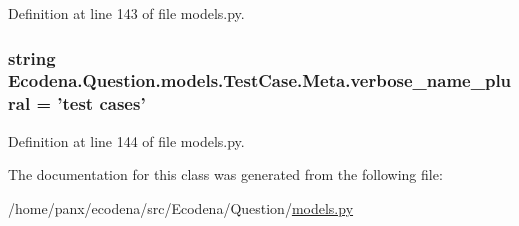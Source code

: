 Definition at line 143 of file models.py.

\hypertarget{class_ecodena_1_1_question_1_1models_1_1_test_case_1_1_meta_a5d437326b1d427e4225daeb42b308535}{
\subsubsection[{verbose\_\-name\_\-plural}]{\setlength{\rightskip}{0pt plus 5cm}string {\bf Ecodena.Question.models.TestCase.Meta.verbose\_\-name\_\-plural} = 'test cases'}}
\label{d7/de8/class_ecodena_1_1_question_1_1models_1_1_test_case_1_1_meta_a5d437326b1d427e4225daeb42b308535}


Definition at line 144 of file models.py.



The documentation for this class was generated from the following file:\begin{DoxyCompactItemize}
\item 
/home/panx/ecodena/src/Ecodena/Question/\hyperlink{_question_2models_8py}{models.py}\end{DoxyCompactItemize}
